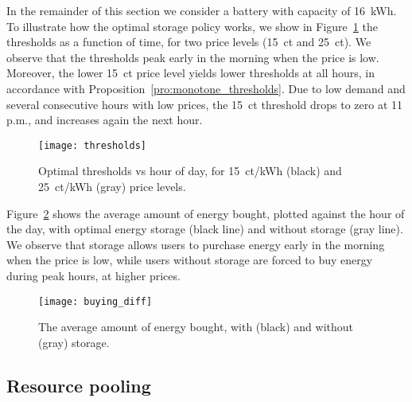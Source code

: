 \documentclass[journal]{IEEEtran}
\newcommand\1{\mathbf{1}}
\begin{document}
In the remainder of this section we consider a battery with capacity of 16~kWh. To illustrate how the optimal storage policy works, we show in Figure~\ref{fig:thresholds} the thresholds as a function of time, for two price levels (15~ct and 25~ct). We observe that the thresholds peak early in the morning when the price is low. Moreover, the lower 15~ct price level yields lower thresholds at all hours, in accordance with Proposition~\ref{pro:monotone_thresholds}. Due to low demand and several consecutive hours with low prices, the 15~ct threshold drops to zero at 11 p.m., and increases again the next hour.
\begin{figure}[h]
    \begin{center}
        \texttt{[image: thresholds]}
    \end{center}
    \caption{Optimal thresholds vs hour of day, for 15~ct/kWh (black) and 25~ct/kWh (gray) price levels.}
    \label{fig:thresholds}
\end{figure}

Figure~\ref{fig:buying_diff} shows the average amount of energy bought, plotted against the hour of the day, with optimal energy storage (black line) and without storage (gray line). We observe that storage allows users to purchase energy early in the morning when the price is low, while users without storage are forced to buy energy during peak hours, at higher prices.
\begin{figure}[h]
    \begin{center}
        \texttt{[image: buying\_diff]}
    \end{center}
    \caption{The average amount of energy bought, with (black) and without (gray) storage.}
    \label{fig:buying_diff}
\end{figure}

\subsection{Resource pooling}
\end{document}
